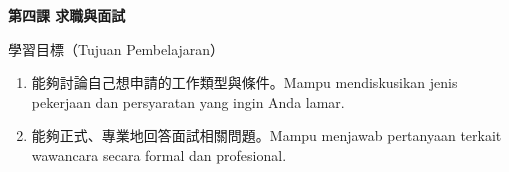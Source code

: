 \documentclass[a4paper,12pt]{ctexart}
\begin{document}
\begin{center}
{\LARGE\bfseries 第四課 求職與面試}

\vspace{0.3cm}
{\large 學習目標（Tujuan Pembelajaran）}
\end{center}

\begin{enumerate}
\item 能夠討論自己想申請的工作類型與條件。Mampu mendiskusikan jenis pekerjaan dan persyaratan yang ingin Anda lamar.
\item 能夠正式、專業地回答面試相關問題。Mampu menjawab pertanyaan terkait wawancara secara formal dan profesional.
\end{enumerate}

\vspace{0.5cm}
\end{document}
